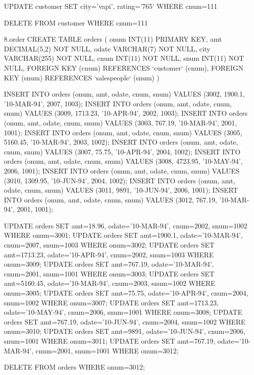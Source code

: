 UPDATE customer
SET city='vapi', rating='765'
WHERE cnum=111

DELETE FROM customer WHERE cnum=111



8.order
CREATE TABLE orders (
	onum INT(11) PRIMARY KEY,
    amt DECIMAL(5,2) NOT NULL,
    odate VARCHAR(7) NOT NULL,
    city VARCHAR(255) NOT NULL,
   	cnum INT(11) NOT NULL,
    snum INT(11) NOT NULL,
    FOREIGN KEY (cnum) REFERENCES `customer` (cnum),
    FOREIGN KEY (snum) REFERENCES `salespeople` (snum)
)

INSERT INTO orders (onum, amt, odate, cnum, snum) VALUES (3002, 1900.1, '10-MAR-94', 2007, 1003);
INSERT INTO orders (onum, amt, odate, cnum, snum) VALUES (3009, 1713.23, '10-APR-94', 2002, 1003);
INSERT INTO orders (onum, amt, odate, cnum, snum) VALUES (3003, 767.19, '10-MAR-94', 2001, 1001);
INSERT INTO orders (onum, amt, odate, cnum, snum) VALUES (3005, 5160.45, '10-MAR-94', 2003, 1002);
INSERT INTO orders (onum, amt, odate, cnum, snum) VALUES (3007, 75.75, '10-APR-94', 2004, 1002);
INSERT INTO orders (onum, amt, odate, cnum, snum) VALUES (3008, 4723.95, '10-MAY-94', 2006, 1001);
INSERT INTO orders (onum, amt, odate, cnum, snum) VALUES (3010, 1309.95, '10-JUN-94', 2004, 1002);
INSERT INTO orders (onum, amt, odate, cnum, snum) VALUES (3011, 9891, '10-JUN-94', 2006, 1001);
INSERT INTO orders (onum, amt, odate, cnum, snum) VALUES (3012, 767.19, '10-MAR-94', 2001, 1001);


UPDATE orders
SET amt=18.96, odate='10-MAR-94', cnum=2002, snum=1002
WHERE onum=3001;
UPDATE orders
SET amt=1900.1, odate='10-MAR-94', cnum=2007, snum=1003
WHERE onum=3002;
UPDATE orders
SET amt=1713.23, odate='10-APR-94', cnum=2002, snum=1003
WHERE onum=3009;
UPDATE orders
SET amt=767.19, odate='10-MAR-94', cnum=2001, snum=1001
WHERE onum=3003;
UPDATE orders
SET amt=5160.45, odate='10-MAR-94', cnum=2003, snum=1002
WHERE onum=3005;
UPDATE orders
SET amt=75.75, odate='10-APR-94', cnum=2004, snum=1002
WHERE onum=3007;
UPDATE orders
SET amt=1713.23, odate='10-MAY-94', cnum=2006, snum=1001
WHERE onum=3008;
UPDATE orders
SET amt=767.19, odate='10-JUN-94', cnum=2004, snum=1002
WHERE onum=3010;
UPDATE orders
SET amt=9891, odate='10-JUN-94', cnum=2006, snum=1001
WHERE onum=3011;
UPDATE orders
SET amt=767.19, odate='10-MAR-94', cnum=2001, snum=1001
WHERE onum=3012;


DELETE FROM orders WHERE onum=3012;